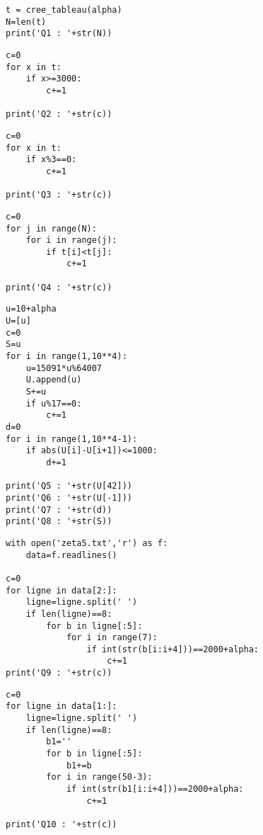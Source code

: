 \exer{}
\setcounter{numques}{0}




\question{
}

\begin{lstlisting}
t = cree_tableau(alpha)
N=len(t)
print('Q1 : '+str(N))
\end{lstlisting}

\question{
}

\begin{lstlisting}
c=0
for x in t:
    if x>=3000:
        c+=1
        
print('Q2 : '+str(c))
\end{lstlisting}


\question{
}

\begin{lstlisting}
c=0
for x in t:
    if x%3==0:
        c+=1
        
print('Q3 : '+str(c))
\end{lstlisting}

\question{
}

\begin{lstlisting}
c=0
for j in range(N):
    for i in range(j):
        if t[i]<t[j]:
            c+=1
            
print('Q4 : '+str(c))
\end{lstlisting}

\question{
}
\question{
}
\question{
}
\question{
}


\begin{lstlisting}
u=10+alpha
U=[u]
c=0
S=u
for i in range(1,10**4):
    u=15091*u%64007
    U.append(u)
    S+=u
    if u%17==0:
        c+=1
d=0
for i in range(1,10**4-1):
    if abs(U[i]-U[i+1])<=1000:
        d+=1
        
print('Q5 : '+str(U[42]))
print('Q6 : '+str(U[-1]))
print('Q7 : '+str(d))
print('Q8 : '+str(S))
\end{lstlisting}

\question{
}

\begin{lstlisting}
with open('zeta5.txt','r') as f:
    data=f.readlines()

c=0
for ligne in data[2:]:
    ligne=ligne.split(' ')
    if len(ligne)==8:
        for b in ligne[:5]:
            for i in range(7):
                if int(str(b[i:i+4]))==2000+alpha:
                    c+=1
print('Q9 : '+str(c))
\end{lstlisting}

\question{
}

\begin{lstlisting}
c=0
for ligne in data[1:]:
    ligne=ligne.split(' ')
    if len(ligne)==8:
        b1=''
        for b in ligne[:5]:
            b1+=b
        for i in range(50-3):
            if int(str(b1[i:i+4]))==2000+alpha:
                c+=1

print('Q10 : '+str(c))
\end{lstlisting}

